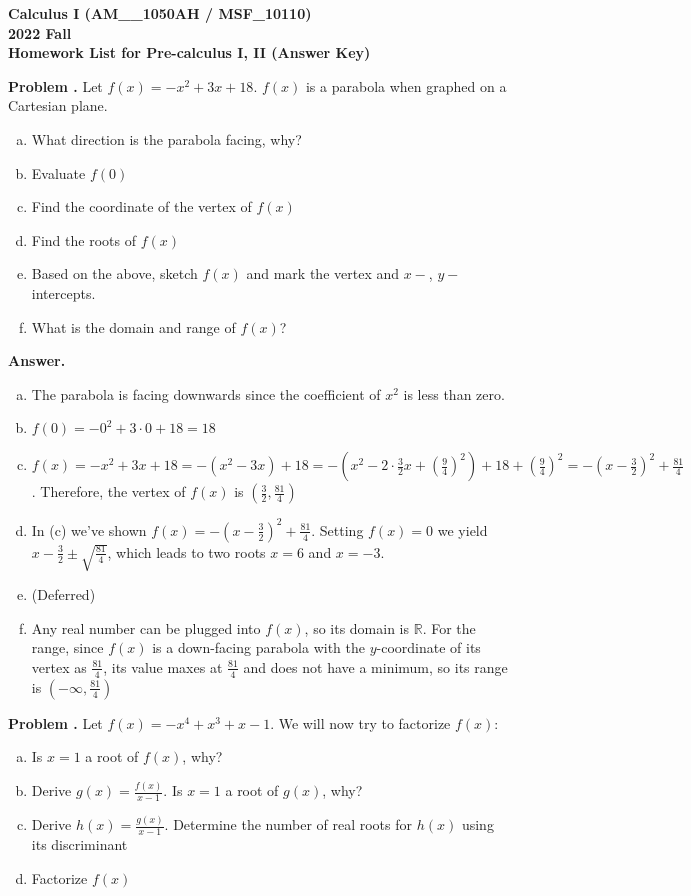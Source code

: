 \documentclass[11pt,letterpaper]{article}
\newcounter{problem}
\newcommand{\problem}{
	\stepcounter{problem}%
	\noindent \textbf{Problem \theproblem. }%
}
\newcommand{\answer}{\noindent \textbf{Answer. }}
\begin{document}
\noindent\textbf{\large Calculus I (AM\_\_1050AH / MSF\_10110) \\ 2022 Fall \\ Homework List for Pre-calculus I, II (Answer Key)}

\bigskip

\problem Let $f(x) = -x^2 + 3x + 18$. $f(x)$ is a parabola when graphed on a Cartesian plane.
    \begin{enumerate}[(a)]
    \item  What direction is the parabola facing, why?
    \item Evaluate $f(0)$
    \item Find the coordinate of the vertex of $f(x)$
    \item Find the roots of $f(x)$
    \item Based on the above, sketch $f(x)$ and mark the vertex and $x-$, $y-$intercepts. 
    \item What is the domain and range of $f(x)$?
    \end{enumerate} \vspace{6mm}

\answer
    \begin{enumerate}[(a)]
    \item The parabola is facing downwards since the coefficient of $x^2$ is less than zero.
    \item $f(0) = -0^2 + 3 \cdot 0 + 18 = 18$
    \item $f(x) = -x^2 + 3x + 18 = -(x^2-3x)+18 = -\left(x^2-2\cdot\frac{3}{2}x+\left(\frac{9}{4}\right)^2\right)+18+\left(\frac{9}{4}\right)^2 = -\left(x-\frac{3}{2}\right)^2 + \frac{81}{4}$.  Therefore, the vertex of $f(x)$ is $(\frac{3}{2}, \frac{81}{4})$
    \item In (c) we've shown $f(x) = -\left(x-\frac{3}{2}\right)^2 + \frac{81}{4}$.  Setting $f(x) = 0$ we yield $x-\frac{3}{2} \pm \sqrt{\frac{81}{4}}$, which leads to two roots $x=6$ and $x=-3$.
    \item (Deferred)
    \item Any real number can be plugged into $f(x)$, so its domain is $\mathbb{R}$.  For the range, since $f(x)$ is a down-facing parabola with the $y$-coordinate of its vertex as $\frac{81}{4}$, its value maxes at $\frac{81}{4}$ and does not have a minimum, so its range is $\left(-\infty, \frac{81}{4}\right)$
    \end{enumerate} \vspace{6mm}

\problem Let $f(x) = -x^4 + x^3 + x - 1$. We will now try to factorize $f(x)$:
	\begin{enumerate}[(a)]
	\item Is $x = 1$ a root of $f(x)$, why? 
	\item Derive $g(x) = \frac{f(x)}{x-1}$. Is $x = 1$ a root of $g(x)$, why?
	\item Derive $h(x) = \frac{g(x)}{x-1}$. Determine the number of real roots for $h(x)$ using its discriminant
	\item Factorize $f(x)$
	\end{enumerate} \vspace{6mm}
	
\end{document}
